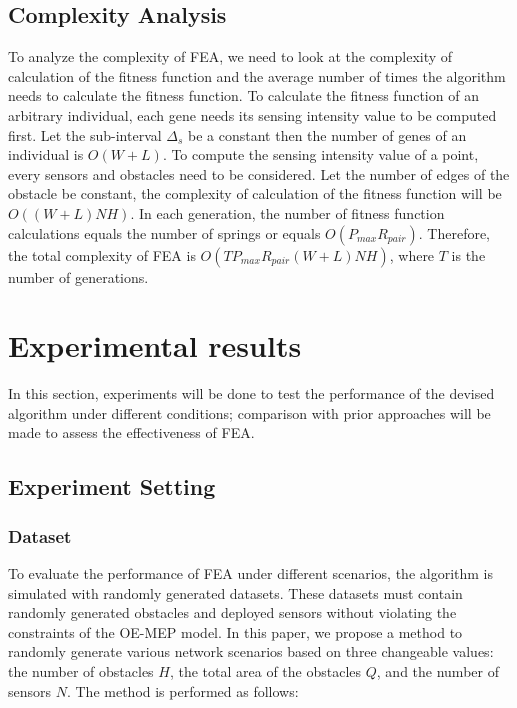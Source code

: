 \documentclass[final]{elsarticle}
\begin{document}
\subsection{Complexity Analysis}

To analyze the complexity of FEA, we need to look at the complexity of calculation of the fitness function and the average number of times the algorithm needs to calculate the fitness function. To calculate the fitness function of an arbitrary individual, each gene needs its sensing intensity value to be computed first. Let the sub-interval $ \Delta_s $ be a constant then the number of genes of an individual is $ O(W+L) $. To compute the sensing intensity value of a point, every sensors and obstacles need to be considered. Let the number of edges of the obstacle be constant, the complexity of calculation of the fitness function will be $ O((W+L)NH) $. In each generation, the number of fitness function calculations equals the number of springs or equals $O(P_{max}R_{pair})$. Therefore, the total complexity of FEA is $O(TP_{max}R_{pair}(W+L)NH)$, where $ T $ is the number of generations.

\section{Experimental results}
In this section, experiments will be done to test the performance of the devised algorithm under different conditions; comparison with prior approaches will be made to assess the effectiveness of FEA. 
\subsection{Experiment Setting}
\subsubsection{Dataset}
To evaluate the performance of FEA under different scenarios, the algorithm is simulated with randomly generated datasets. These datasets must contain randomly generated obstacles and deployed sensors without violating the constraints of the OE-MEP model. In this paper, we propose a method to randomly generate various network scenarios based on three changeable values: the number of obstacles $H$, the total area of the obstacles $Q$, and the number of sensors $N$. The method is performed as follows: 
\end{document}
